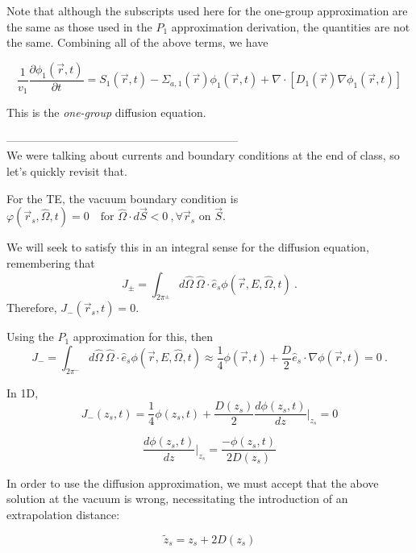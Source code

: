 \documentclass[12pt]{article}
\newcommand{\rvec}{\ensuremath{\vec{r}}}
\newcommand{\omvec}{\ensuremath{\hat{\Omega}}}
\begin{document}
Note that although the subscripts used here for the one-group approximation are the same as those used in
the $P_1$ approximation derivation, the quantities are not the same. Combining all of the above terms, we
have

\begin{equation*}
\frac{1}{v_1}\frac{\partial \phi_1(\rvec,t)}{\partial t} = S_1(\rvec,t) - 
\Sigma_{a,1}(\rvec)\phi_1(\rvec,t) + \nabla\cdot[D_1(\rvec)\nabla\phi_1(\rvec,t)]
\end{equation*}

This is the \emph{one-group} diffusion equation.

--------------------------------------------------------------\\
We were talking about currents and boundary conditions at the end of class, so let's quickly revisit that. 

For the TE, the vacuum boundary condition is $\varphi (\vec{r}_s, \omvec, t) = 0 \quad \text{for }\omvec \cdot d\vec{S} < 0\:, \forall \rvec_s \text{ on } \vec{S}$.

We will seek to satisfy this in an integral sense for the diffusion equation, remembering that
\begin{equation*}
J_{\pm} = \int_{2\pi^{\pm}}d\omvec\:\omvec\cdot\hat{e}_s\phi(\rvec,E,\omvec,t)\:.
\end{equation*}
Therefore, $J_-(\rvec_s,t) = 0$.

Using the $P_1$ approximation for this, then
\[J_{-} = \int_{2\pi^{-}}d\omvec\:\omvec\cdot\hat{e}_s\phi(\rvec,E,\omvec,t) \approx \frac{1}{4}\phi(\rvec, t) + \frac{D}{2}\hat{e}_s \cdot \nabla \phi(\rvec, t) = 0\:.\]


In 1D,
\begin{equation*}
J_-(z_s,t) = \frac{1}{4}\phi(z_s,t) + \frac{D(z_s)}{2}\frac{d\phi(z_s,t)}{dz}\Bigr|_{z_s} = 0
\end{equation*}

\begin{equation*}
\frac{d\phi(z_s,t)}{dz}\Bigr|_{z_s} = \frac{-\phi(z_s,t)}{2D(z_s)}
\end{equation*}

In order to use the diffusion approximation, we must accept that the above solution at the vacuum is wrong, necessitating the introduction of an extrapolation distance:

\begin{equation*}
\tilde{z}_s = z_s + 2D(z_s)
\end{equation*}
\end{document}
